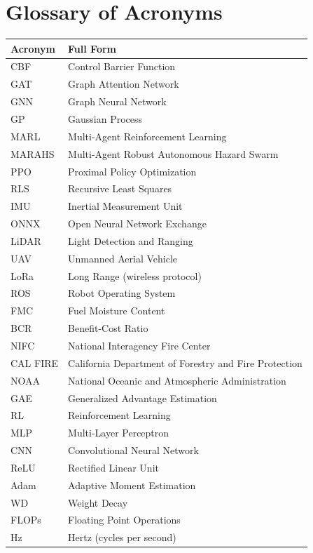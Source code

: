 \documentclass[12pt,a4paper]{article}
\begin{document}
\section{Glossary of Acronyms}
\label{app:acronyms}

\begin{tabular}{ll}
\toprule
\textbf{Acronym} & \textbf{Full Form} \\
\midrule
CBF & Control Barrier Function \\
GAT & Graph Attention Network \\
GNN & Graph Neural Network \\
GP & Gaussian Process \\
MARL & Multi-Agent Reinforcement Learning \\
MARAHS & Multi-Agent Robust Autonomous Hazard Swarm \\
PPO & Proximal Policy Optimization \\
RLS & Recursive Least Squares \\
IMU & Inertial Measurement Unit \\
ONNX & Open Neural Network Exchange \\
LiDAR & Light Detection and Ranging \\
UAV & Unmanned Aerial Vehicle \\
LoRa & Long Range (wireless protocol) \\
ROS & Robot Operating System \\
FMC & Fuel Moisture Content \\
BCR & Benefit-Cost Ratio \\
NIFC & National Interagency Fire Center \\
CAL FIRE & California Department of Forestry and Fire Protection \\
NOAA & National Oceanic and Atmospheric Administration \\
GAE & Generalized Advantage Estimation \\
RL & Reinforcement Learning \\
MLP & Multi-Layer Perceptron \\
CNN & Convolutional Neural Network \\
ReLU & Rectified Linear Unit \\
Adam & Adaptive Moment Estimation \\
WD & Weight Decay \\
FLOPs & Floating Point Operations \\
Hz & Hertz (cycles per second) \\
\bottomrule
\end{tabular}
\end{document}
